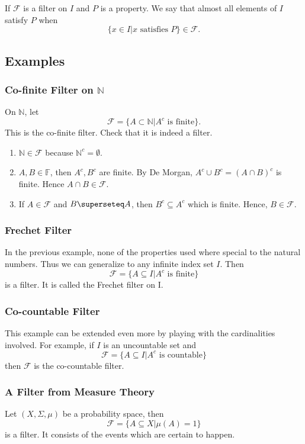 \documentclass[12pt]{article}
\newenvironment{definition}[2][Definition]{\begin{trivlist}
\item[\hskip \labelsep {\bfseries #1}\hskip \labelsep {\bfseries #2.}]}{\end{trivlist}}
\begin{document}
\begin{definition}{almost all}
If $\mathcal{F}$ is a filter on $I$ and $P$ is a property.  We say that almost all elements of $I$ satisfy $P$ when
\[
\{ x \in I | x \textrm{ satisfies } P\} \in \mathcal{F}.
\]
\end{definition}

\subsection{Examples}
\subsubsection{Co-finite Filter on $\mathbb{N}$}
On $\mathbb{N}$, let
\[\mathcal{F} = \{A \subset \mathbb{N} | A^c \textrm{ is finite} \}.
\]
This is the co-finite filter.  Check that it is indeed a filter.

\begin{enumerate}
    \item $\mathbb{N} \in \mathcal{F}$ because $\mathbb{N}^c = \emptyset$.
    \item $A, B \in \mathbb{F}$, then $A^c, B^c$ are finite.  By De Morgan, $A^c \cup B^c = (A \cap B)^c$ is finite.  Hence $A \cap B \in \mathcal{F}$.
    \item If $A \in \mathcal{F}$ and $B \superseteq A$, then $B^c \subseteq A^c$ which is finite.  Hence, $B \in \mathcal{F}$.
\end{enumerate}

\subsubsection{Frechet Filter}
In the previous example, none of the properties used where special to the natural numbers.  Thus we can generalize to any infinite index set $I$.  Then
\[
\mathcal{F} = \{ A \subseteq I | A^c \textrm{ is finite} \}
\]
is a filter.  It is called the Frechet filter on I.

\subsubsection{Co-countable Filter}
This example can be extended even more by playing with the cardinalities involved.  For example, if $I$ is an uncountable set and
\[
\mathcal{F} = \{ A \subseteq I| A^c \textrm{ is countable}\}
\]
then $\mathcal{F}$ is the co-countable filter.

\subsubsection{A Filter from Measure Theory}
Let $(X, \Sigma, \mu)$ be a probability space, then 
\[
\mathcal{F} = \{ A \subseteq X | \mu(A) = 1 \}
\]
is a filter.  It consists of the events which are certain to happen.
\end{document}
